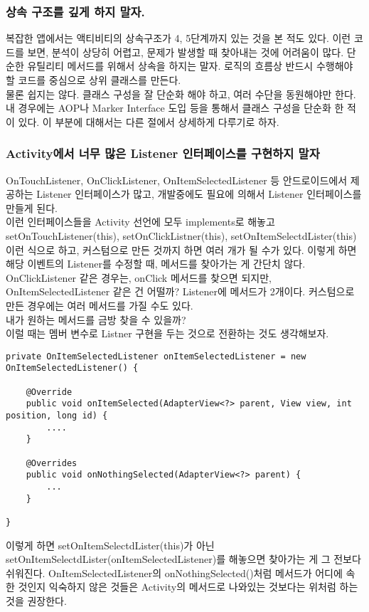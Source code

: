 \subsubsection{상속 구조를 깊게 하지 말자.}
복잡한 앱에서는 액티비티의 상속구조가 4, 5단계까지 있는 것을 본 적도 있다. 이런 코드를 보면, 분석이 상당히 어렵고, 문제가 발생할 때 찾아내는 것에 어려움이 많다.
단순한 유틸리티 메서드를 위해서 상속을 하지는 말자. 로직의 흐름상 반드시 수행해야 할 코드를 중심으로 상위 클래스를 만든다.\\

물론 쉽지는 않다. 클래스 구성을 잘 단순화 해야 하고, 여러 수단을 동원해야만 한다. 내 경우에는 AOP나 Marker Interface 도입 등을 통해서 클래스 구성을 단순화 한 적이 있다. 이 부분에 대해서는 다른 절에서 상세하게 다루기로 하자.\\

\subsubsection{Activity에서 너무 많은 Listener 인터페이스를 구현하지 말자}
OnTouchListener, OnClickListener, OnItemSelectedListener 등 안드로이드에서 제공하는 Listener 인터페이스가 많고, 개발중에도 필요에 의해서 Listener 인터페이스를 만들게 된다.\\

이런 인터페이스들을 Activity 선언에 모두 implements로 해놓고 setOnTouchListener(this), setOnClickListner(this), setOnItemSelectdLister(this) 이런 식으로 하고, 커스텀으로 만든 것까지 하면 여러 개가 될 수가 있다. 이렇게 하면 해당 이벤트의 Listener를 수정할 때, 메서드를 찾아가는 게 간단치 않다. OnClickListener 같은 경우는, onClick 메서드를 찾으면 되지만, OnItemSelectedListener 같은 건 어떨까? Listener에 메서드가 2개이다. 커스텀으로 만든 경우에는 여러 메서드를 가질 수도 있다.\\ 
내가 원하는 메서드를 금방 찾을 수 있을까?\\

이럴 때는 멤버 변수로 Listner 구현을 두는 것으로 전환하는 것도 생각해보자.

\begin{lstlisting}[frame=single]
private OnItemSelectedListener onItemSelectedListener = new OnItemSelectedListener() {

	@Override
	public void onItemSelected(AdapterView<?> parent, View view, int position, long id) {
		....
	}
	
	@Overrides
	public void onNothingSelected(AdapterView<?> parent) {
		...
	}

}	
\end{lstlisting}	
이렇게 하면 setOnItemSelectdLister(this)가 아닌 setOnItemSelectdLister(onItemSelectedListener)를 해놓으면 찾아가는 게 그 전보다 쉬워진다. OnItemSelectedListener의 onNothingSelected()처럼 메서드가 어디에 속한 것인지 익숙하지 않은 것들은 Activity의 메서드로 나와있는 것보다는 위처럼 하는 것을 권장한다.\\

